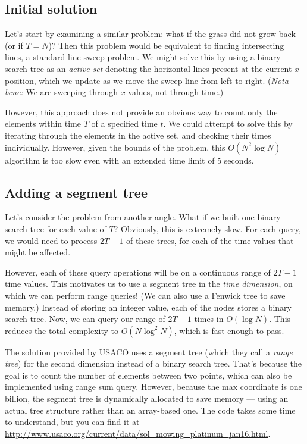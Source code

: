 \documentclass{article}
\begin{document}
\subsection{Initial solution}
Let's start by examining a similar problem: what if the grass did not grow back (or if $T = N$)? Then this problem would be equivalent to finding intersecting lines, a standard line-sweep problem. We might solve this by using a binary search tree as an \textit{active set} denoting the horizontal lines present at the current $x$ position, which we update as we move the sweep line from left to right. (\textit{Nota bene:} We are sweeping through $x$ values, not through time.)

However, this approach does not provide an obvious way to count only the elements within time $T$ of a specified time $t$. We could attempt to solve this by iterating through the elements in the active set, and checking their times individually. However, given the bounds of the problem, this $O(N^2 \log N)$ algorithm is too slow even with an extended time limit of 5 seconds.

\subsection{Adding a segment tree}
Let's consider the problem from another angle. What if we built one binary search tree for each value of $T$? Obviously, this is extremely slow. For each query, we would need to process $2T-1$ of these trees, for each of the time values that might be affected.

However, each of these query operations will be on a continuous range of $2T-1$ time values. This motivates us to use a segment tree in the \textit{time dimension}, on which we can perform range queries! (We can also use a Fenwick tree to save memory.) Instead of storing an integer value, each of the nodes stores a binary search tree. Now, we can query our range of $2T-1$ times in $O(\log N)$. This reduces the total complexity to $O(N \log^2 N)$, which is fast enough to pass.

The solution provided by USACO uses a segment tree (which they call a \textit{range tree}) for the second dimension instead of a binary search tree. That's because the goal is to count the number of elements between two points, which can also be implemented using range sum query. However, because the max coordinate is one billion, the segment tree is dynamically allocated to save memory --- using an actual tree structure rather than an array-based one. The code takes some time to understand, but you can find it at \url{http://www.usaco.org/current/data/sol_mowing_platinum_jan16.html}.
\end{document}
